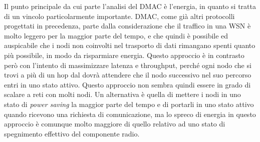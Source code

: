 \documentclass[twoside,11pt,a4paper,italian,openany]{book}
\begin{document}
Il punto principale da cui parte l'analisi del DMAC è l'energia, in quanto si tratta di un 
vincolo particolarmente importante. DMAC, come già altri protocolli\cite{SMAC} 
progettati in precedenza, parte dalla considerazione che il traffico in una WSN è molto leggero 
per la maggior parte del tempo, e che quindi è 
possibile ed auspicabile che i nodi non coinvolti nel trasporto di dati rimangano spenti 
quanto più possibile, in modo da risparmiare energia. 
Questo approccio è in contrasto però con l'intento di massimizzare latenza e throughput, 
perché ogni nodo che si trovi a più di un hop dal \sink dovrà attendere che il nodo successivo 
nel suo percorso entri in uno stato attivo. Questo approccio non sembra quindi essere in grado 
di scalare a reti con molti nodi. 
Un alternativa è quella di mettere i nodi in uno stato di \emph{power saving} la 
maggior parte del tempo e di portarli in uno stato attivo quando ricevono una richiesta di 
comunicazione, ma lo spreco di energia in questo approccio è comunque molto maggiore di quello 
relativo ad uno stato di spegnimento effettivo del componente radio. 
\end{document}

